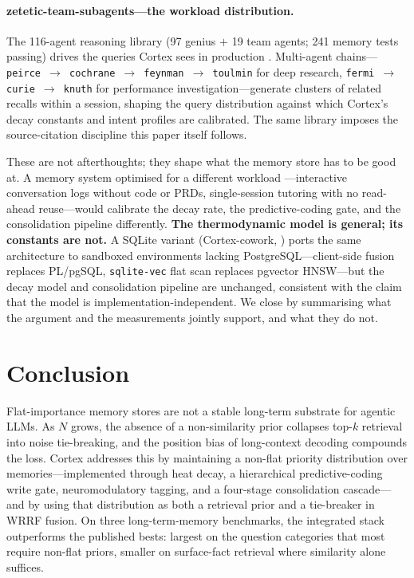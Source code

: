 \documentclass[11pt]{article}
\begin{document}
\paragraph{zetetic-team-subagents---the workload distribution.}
The 116-agent reasoning library (97 genius $+$ 19 team agents;
241 memory tests passing) drives the queries Cortex sees in
production \citep{Deust2026d}.  Multi-agent chains---\texttt{peirce
$\to$ cochrane $\to$ feynman $\to$ toulmin} for deep research,
\texttt{fermi $\to$ curie $\to$ knuth} for performance
investigation---generate clusters of related recalls within a
session, shaping the query distribution against which Cortex's
decay constants and intent profiles are calibrated.  The same
library imposes the source-citation discipline this paper itself
follows.

These are not afterthoughts; they shape what the memory store has
to be good at.  A memory system optimised for a different workload
---interactive conversation logs without code or PRDs,
single-session tutoring with no read-ahead reuse---would calibrate
the decay rate, the predictive-coding gate, and the consolidation
pipeline differently.  \textbf{The thermodynamic model is general;
its constants are not.}  A SQLite variant
(Cortex-cowork, \citealp{Deust2026e}) ports the same architecture
to sandboxed environments lacking PostgreSQL---client-side fusion
replaces PL/pgSQL, \texttt{sqlite-vec} flat scan replaces pgvector
HNSW---but the decay model and consolidation pipeline are
unchanged, consistent with the claim that the model is
implementation-independent.  We close by summarising what the
argument and the measurements jointly support, and what they do
not.

\section{Conclusion}
\label{sec:conclusion}

Flat-importance memory stores are not a stable long-term substrate
for agentic LLMs.  As $N$ grows, the absence of a non-similarity
prior collapses top-$k$ retrieval into noise tie-breaking, and the
position bias of long-context decoding compounds the loss.  Cortex
addresses this by maintaining a non-flat priority distribution over
memories---implemented through heat decay, a hierarchical
predictive-coding write gate, neuromodulatory tagging, and a
four-stage consolidation cascade---and by using that distribution
as both a retrieval prior and a tie-breaker in WRRF fusion.  On
three long-term-memory benchmarks, the integrated stack outperforms
the published bests: largest on the question categories that most
require non-flat priors, smaller on surface-fact retrieval where
similarity alone suffices.
\end{document}
